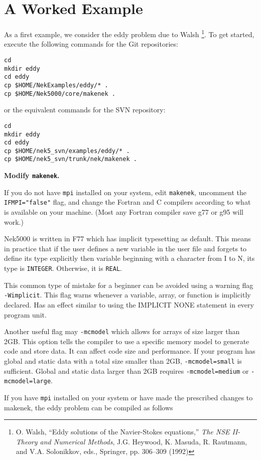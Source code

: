 \section{A Worked Example}
As a first example, we consider the eddy problem due to Walsh 
\footnote{O. Walsh, ``Eddy solutions of the Navier-Stokes equations,''
{\em The NSE II-Theory and Numerical Methods}, J.G. Heywood, K. Masuda, 
R. Rautmann, and V.A. Solonikkov, eds., Springer, pp.  306--309 (1992)}.
To get started, execute the following commands for the Git repositories:
\begin{verbatim}
cd
mkdir eddy
cd eddy
cp $HOME/NekExamples/eddy/* .
cp $HOME/Nek5000/core/makenek .
\end{verbatim}
or the equivalent commands for the SVN repository:
\begin{verbatim}
cd
mkdir eddy
cd eddy
cp $HOME/nek5_svn/examples/eddy/* .
cp $HOME/nek5_svn/trunk/nek/makenek .
\end{verbatim}

{\bf Modify {\tt makenek}.}

If you do not have {\tt mpi} installed on your system, edit {\tt makenek},
uncomment the {\tt IFMPI="false"} flag, and change the Fortran and C
compilers according to what is available on your machine.  (Most any
Fortran compiler save g77 or g95 will work.)

Nek5000 is written in F77 which has implicit typesetting as default. This means in practice that if the user defines a new variable in the user file and forgets to define its type explicitly then variable beginning with a character from I to N, its type is {\tt INTEGER}. Otherwise, it is {\tt REAL}. 

This common type of mistake for a beginner can be avoided using a warning flag {\tt -Wimplicit}. This flag warns whenever a variable, array, or function is implicitly declared. Has an effect similar to using the IMPLICIT NONE statement in every program unit. 

Another useful flag may {\tt -mcmodel} which allows for arrays of size larger than 2GB. This option tells the compiler to use a specific memory model to generate code and store data. It can affect code size and performance. If your program has global and static data with a total size smaller than 2GB, {\tt -mcmodel=small} is sufficient. Global and static data larger than 2GB requires {\tt -mcmodel=medium} or {\tt -mcmodel=large}.


If you have {\tt mpi} installed on your system or have made the prescribed
changes to makenek, the eddy problem can be compiled as follows


